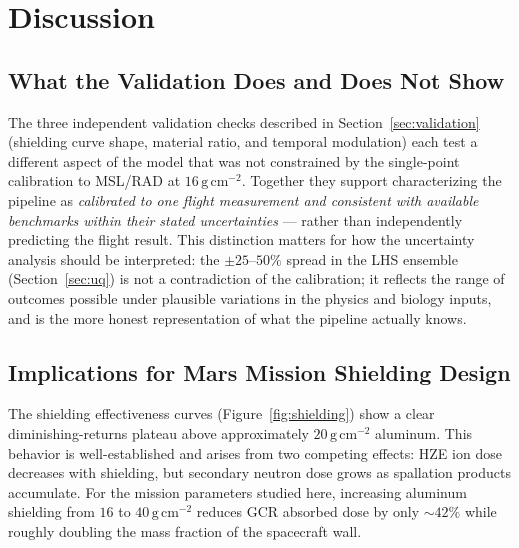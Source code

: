 
\section{Discussion}
\label{sec:discussion}

\subsection{What the Validation Does and Does Not Show}
\label{sec:discuss_validation}

The three independent validation checks described in
Section~\ref{sec:validation} (shielding curve shape, material ratio, and
temporal modulation) each test a different aspect of the model that was
not constrained by the single-point calibration to MSL/RAD at
$16\,\mathrm{g\,cm^{-2}}$.
Together they support characterizing the pipeline as \emph{calibrated to
one flight measurement and consistent with available benchmarks within
their stated uncertainties} — rather than independently predicting the
flight result.
This distinction matters for how the uncertainty analysis should be
interpreted: the $\pm25$--$50\%$ spread in the LHS ensemble
(Section~\ref{sec:uq}) is not a contradiction of the calibration; it
reflects the range of outcomes possible under plausible variations in
the physics and biology inputs, and is the more honest representation
of what the pipeline actually knows.

\subsection{Implications for Mars Mission Shielding Design}
\label{sec:discuss_shielding}

The shielding effectiveness curves (Figure~\ref{fig:shielding}) show a clear
diminishing-returns plateau above approximately $20\,\mathrm{g\,cm^{-2}}$
aluminum.
This behavior is well-established \citep{cucinotta2006, slaba2014} and arises
from two competing effects: HZE ion dose decreases with shielding, but
secondary neutron dose grows as spallation products accumulate.
For the mission parameters studied here, increasing aluminum shielding from
$16$ to $40\,\mathrm{g\,cm^{-2}}$ reduces GCR absorbed dose by only
$\sim\!42\%$ while roughly doubling the mass fraction of the spacecraft wall.


